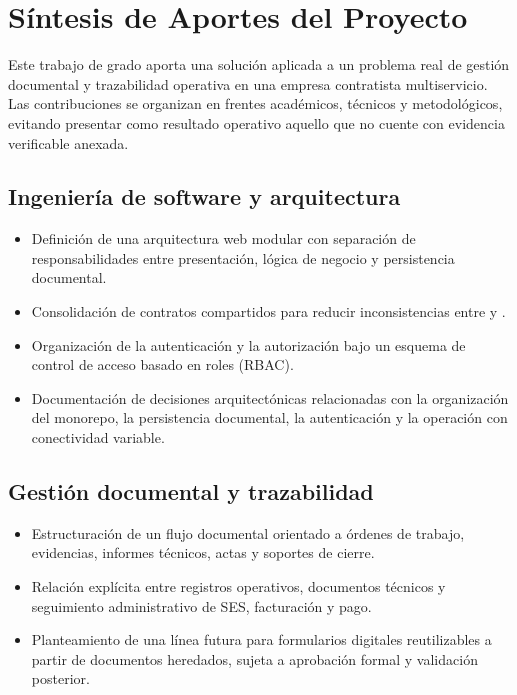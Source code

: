\chapter*{Síntesis de Aportes del Proyecto}

Este trabajo de grado aporta una solución aplicada a un problema real de gestión documental y trazabilidad operativa en una empresa contratista multiservicio. Las contribuciones se organizan en frentes académicos, técnicos y metodológicos, evitando presentar como resultado operativo aquello que no cuente con evidencia verificable anexada.

\section*{Ingeniería de software y arquitectura}
\begin{itemize}
  \item Definición de una arquitectura web modular con separación de responsabilidades entre presentación, lógica de negocio y persistencia documental.
  \item Consolidación de contratos compartidos para reducir inconsistencias entre \frontend{} y \backend{}.
  \item Organización de la autenticación y la autorización bajo un esquema de control de acceso basado en roles (RBAC).
  \item Documentación de decisiones arquitectónicas relacionadas con la organización del monorepo, la persistencia documental, la autenticación y la operación con conectividad variable.
\end{itemize}

\section*{Gestión documental y trazabilidad}
\begin{itemize}
  \item Estructuración de un flujo documental orientado a órdenes de trabajo, evidencias, informes técnicos, actas y soportes de cierre.
  \item Relación explícita entre registros operativos, documentos técnicos y seguimiento administrativo de SES, facturación y pago.
  \item Planteamiento de una línea futura para formularios digitales reutilizables a partir de documentos heredados, sujeta a aprobación formal y validación posterior.
\end{itemize}

